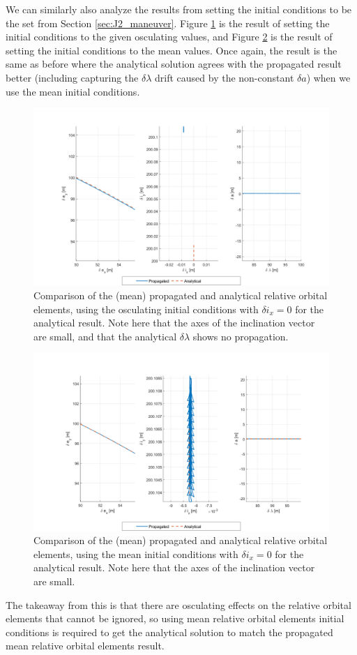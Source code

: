 We can similarly also analyze the results from setting the initial conditions to be the set from Section \ref{sec:J2_maneuver}. Figure \ref{fig:roe_analytical_compare_osc_zeroed} is the result of setting the initial conditions to the given osculating values, and Figure \ref{fig:roe_analytical_compare_mean_zeroed} is the result of setting the initial conditions to the mean values. Once again, the result is the same as before where the analytical solution agrees with the propagated result better (including capturing the $\delta \lambda$ drift caused by the non-constant $\delta a$) when we use the mean initial conditions.

\begin{figure}[H]
    \centering
    \includegraphics[width=0.8\linewidth]{sim/figures/PS4/ROE_analytical_compare_given_IC3_SV2.png}
    \caption{Comparison of the (mean) propagated and analytical relative orbital elements, using the osculating initial conditions with $\delta i_x = 0$ for the analytical result. Note here that the axes of the inclination vector are small, and that the analytical $\delta \lambda$ shows no propagation.}
\label{fig:roe_analytical_compare_osc_zeroed}
\end{figure}

\begin{figure}[H]
    \centering
    \includegraphics[width=0.8\linewidth]{sim/figures/PS4/ROE_analytical_compare_mean_IC3_SV2.png}
    \caption{Comparison of the (mean) propagated and analytical relative orbital elements, using the mean initial conditions with $\delta i_x = 0$ for the analytical result. Note here that the axes of the inclination vector are small.}
\label{fig:roe_analytical_compare_mean_zeroed}
\end{figure}

The takeaway from this is that there are osculating effects on the relative orbital elements that cannot be ignored, so using mean relative orbital elements initial conditions is required to get the analytical solution to match the propagated mean relative orbital elements result.